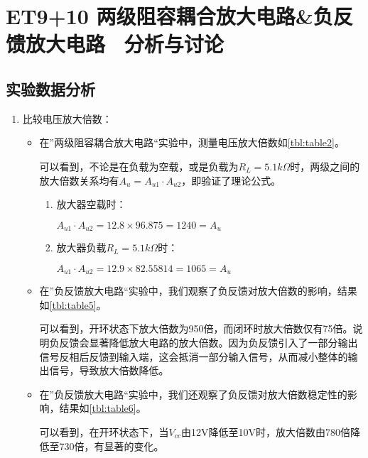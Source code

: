 \documentclass[dvipsnames, svgnames,a4paper,11pt]{article}
\begin{document}
	\section{ET9+10 \quad 两级阻容耦合放大电路\&负反馈放大电路 \ \heiti 分析与讨论}
	
	\subsection{实验数据分析}
	
	
		
			\begin{enumerate}
				
				\item 比较电压放大倍数：
				
					\begin{itemize}
						\item 在”两级阻容耦合放大电路“实验中，测量电压放大倍数如\cref{tbl:table2}。

							可以看到，不论是在负载为空载，或是负载为$R_L=5.1k\Omega$时，两级之间的放大倍数关系均有$A_u = A_{u1} \cdot A_{u2}$，即验证了理论公式。
			
								\begin{enumerate}
									\item 放大器空载时：
			
										$A_{u1} \cdot A_{u2} = 12.8 \times 96.875 = 1240 = A_u$
			
			
									\item 放大器负载$R_L=5.1k\Omega$时：
									
										$A_{u1} \cdot A_{u2} = 12.9 \times 82.55814 = 1065 = A_u$	
								\end{enumerate}
						
						\item 在”负反馈放大电路“实验中，我们观察了负反馈对放大倍数的影响，结果如\cref{tbl:table5}。
						
								可以看到，开环状态下放大倍数为950倍，而闭环时放大倍数仅有75倍。说明负反馈会显著降低放大电路的放大倍数。因为负反馈引入了一部分输出信号反相后反馈到输入端，这会抵消一部分输入信号，从而减小整体的输出信号，导致放大倍数降低。

						\item 在”负反馈放大电路“实验中，我们还观察了负反馈对放大倍数稳定性的影响，结果如\cref{tbl:table6}。
						
								可以看到，在开环状态下，当$V_{cc}$由12V降低至10V时，放大倍数由780倍降低至730倍，有显著的变化。


\end{itemize}
\end{enumerate}
\end{document}
